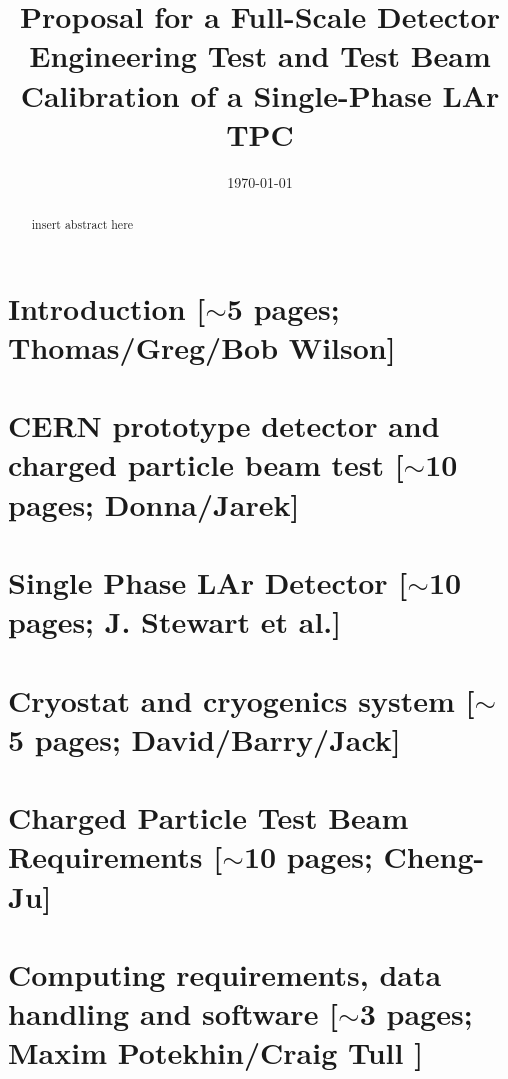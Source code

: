 \documentclass[12pt]{article}
\begin{document}
\title{  Proposal for a Full-Scale Detector Engineering Test and Test Beam Calibration of a Single-Phase LAr TPC}


\date{\today}
	

\maketitle



\begin{abstract}

insert abstract here

\end{abstract}

\newpage
\tableofcontents

\newpage

\section{Introduction [$\sim$5 pages; {\color{red} Thomas/Greg/Bob Wilson}]}
	
%	

\section{CERN prototype detector and charged particle beam test [$\sim$10 pages; {\color{red} Donna/Jarek}]}
	
	

\section{Single Phase LAr Detector [$\sim$10 pages; {\color{red} J. Stewart et al.}]}
\rm

	


\section{Cryostat and cryogenics system [$\sim$5 pages; {\color{red} David/Barry/Jack}]}
	

\newpage
\section{Charged Particle Test Beam Requirements [$\sim$10 pages; {\color{red} Cheng-Ju}]}
	


\section{Computing requirements, data handling and software  [$\sim$3 pages; {\color{red} Maxim Potekhin/Craig Tull }]}
	
\end{document}
